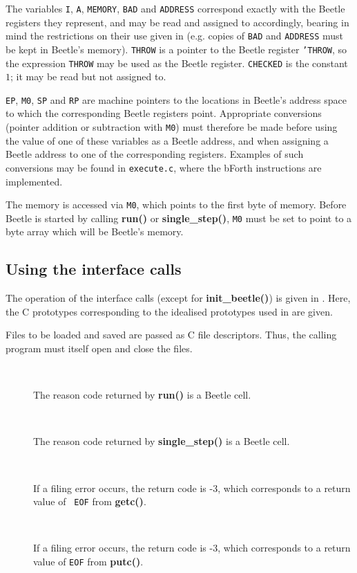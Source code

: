 \documentclass{article}
\newlength{\ifacewidth}\ifacewidth=\textwidth \advance\ifacewidth by -0.1in
\newlength{\innerwidth}\innerwidth=\ifacewidth \advance\innerwidth by -0.5in
\newcommand{\ifacec}[2]{\item[]\parbox{\ifacewidth}{\hspace*{2.5mm}{\tt #1}\\[0.5ex]\hspace*{0.4in}\parbox{\innerwidth}{#2}}}
\begin{document}
The variables {\tt I}, {\tt A}, {\tt MEMORY}, {\tt BAD} and {\tt ADDRESS}
correspond exactly with the Beetle registers they represent, and may be read
and assigned to accordingly, bearing in mind the restrictions on their use
given in \cite{beetle} (e.g. copies of {\tt BAD} and {\tt ADDRESS} must be
kept in Beetle's memory). {\tt THROW} is a pointer to the Beetle register
{\tt 'THROW}, so the expression {\tt *THROW} may be used as the Beetle
register. {\tt CHECKED} is the constant $1$; it may be read but not
assigned to.

{\tt EP}, {\tt M0}, {\tt SP} and {\tt RP} are machine pointers to the
locations in Beetle's address space to which the corresponding Beetle
registers point. Appropriate conversions (pointer addition or subtraction
with {\tt M0}) must therefore be made before using the value of one of these
variables as a Beetle address, and when assigning a Beetle address to one of
the corresponding registers. Examples of such conversions may be found in
{\tt execute.c}, where the bForth instructions are implemented.

The memory is accessed via {\tt M0}, which points to the first byte of
memory. Before Beetle is started by calling {\bf run()} or {\bf
single\_step()}, {\tt M0} must be set to point to a byte array which will be
Beetle's memory.


\subsection{Using the interface calls}
\label{usingcalls}

The operation of the interface calls (except for {\bf init\_beetle()}) is
given in \cite{beetle}. Here, the C prototypes corresponding to the idealised
prototypes used in \cite{beetle} are given.

Files to be loaded and saved are passed as C file descriptors. Thus, the
calling program must itself open and close the files.

\begin{description}
\ifacec{CELL run()}{The reason code returned by {\bf run()} is a Beetle
cell.}
\ifacec{CELL single\_step()}{The reason code returned by {\bf single\_step()}
is a Beetle cell.}
\ifacec{int load\_object(FILE *file, CELL *address)}{If a filing error
occurs, the return code is -3, which corresponds to a return value of {\tt
EOF} from {\bf getc()}.}
\ifacec{int save\_object(FILE *file, CELL *address, UCELL length)}{If a
filing error occurs, the return code is -3, which corresponds to a return
value of {\tt EOF} from {\bf putc()}.}
\end{description}
\end{document}
